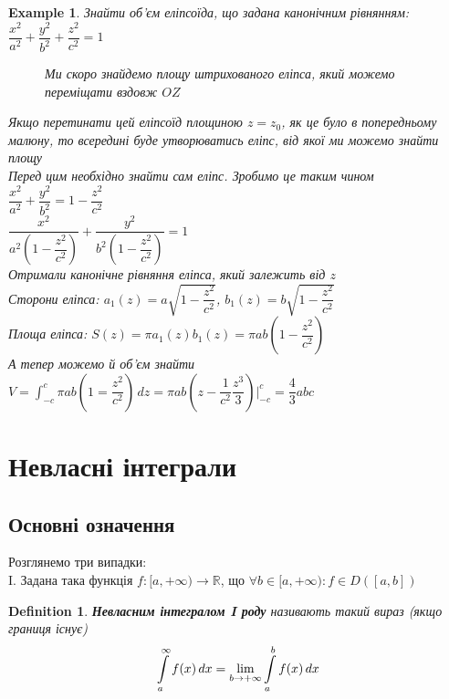 \documentclass[a4paper, 14pt]{extarticle}
\def\huge{\displaystyle}
\theoremstyle{theoremdd}
\theoremstyle{theoremdd}
\newtheorem{definition}[theorem]{Definition}
\theoremstyle{theoremdd}
\theoremstyle{theoremdd}
\newtheorem{example}[theorem]{Example}
\theoremstyle{theoremdd}
\theoremstyle{theoremdd}
\theoremstyle{theoremdd}
\theoremstyle{theoremdd}
\begin{document}
\begin{example}
Знайти об'єм еліпсоїда, що задана канонічним рівнянням:\\
$\dfrac{x^2}{a^2} + \dfrac{y^2}{b^2} + \dfrac{z^2}{c^2} = 1$
\begin{figure}[H]
\centering
{}
\caption*{Ми скоро знайдемо площу штрихованого еліпса, який можемо переміщати вздовж $OZ$}
\end{figure}
Якщо перетинати цей еліпсоїд площиною $z=z_0$, як це було в попередньому малюну, то всередині буде утворюватись еліпс, від якої ми можемо знайти площу\\
Перед цим необхідно знайти сам еліпс. Зробимо це таким чином\\
$\dfrac{x^2}{a^2} + \dfrac{y^2}{b^2} = 1 - \dfrac{z^2}{c^2}$\\
$\dfrac{x^2}{a^2 \left(1 - \dfrac{z^2}{c^2} \right)} + \dfrac{y^2}{b^2 \left(1 - \dfrac{z^2}{c^2} \right)} = 1$\\
Отримали канонічне рівняння еліпса, який залежить від $z$\\
Сторони еліпса: $a_1(z) = a \sqrt{1 - \dfrac{z^2}{c^2}}$, $b_1(z) = b \sqrt{1 - \dfrac{z^2}{c^2}}$\\
Площа еліпса: $S(z) = \pi a_1(z) b_1(z) = \pi ab \left(1 - \dfrac{z^2}{c^2} \right)$\\
А тепер можемо й об'єм знайти\\
$V = \huge\int_{-c}^c \pi ab \left( 1 = \dfrac{z^2}{c^2} \right)\,dz = \pi ab \left(z - \dfrac{1}{c^2} \dfrac{z^3}{3} \right) \Big|_{-c}^c = \dfrac{4}{3}abc$

\end{example}
\newpage

\section{Невласні інтеграли}
\subsection{Основні означення}
Розглянемо три випадки:\\
I. Задана така функція $f: [a,+\infty) \to \mathbb{R}$, що $\forall b \in [a,+\infty): f \in D([a,b])$
\begin{definition}
\textbf{Невласним інтегралом I роду} називають такий вираз (якщо границя існує)
\begin{align*}
\int\displaylimits_a^\infty f(x)\,dx = \lim_{b \to +\infty} \int\displaylimits_a^b f(x)\,dx
\end{align*}
\end{definition}
\end{document}
